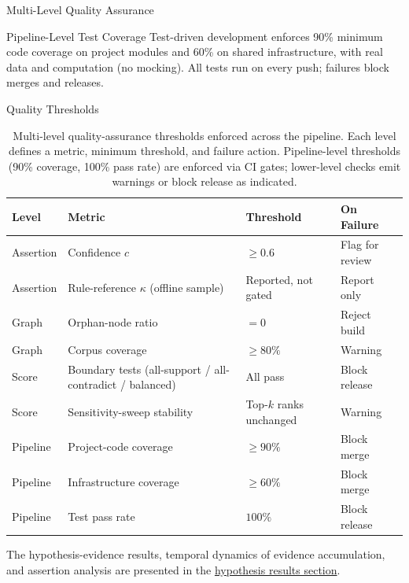 \documentclass[
  ignorenonframetext,
]{beamer}
\begin{document}
\begin{frame}[allowframebreaks]{Multi-Level Quality Assurance}
\begin{block}{Pipeline-Level Test Coverage}
\protect{}\label{pipeline-level-test-coverage}
Test-driven development enforces 90\% minimum code coverage on project
modules and 60\% on shared infrastructure, with real data and
computation (no mocking). All tests run on every push; failures block
merges and releases.
\end{block}

\begin{block}{Quality Thresholds}
\protect{}\label{quality-thresholds}
\begin{table}[H]
\centering
\caption{Multi-level quality-assurance thresholds enforced across the pipeline. Each level defines a metric, minimum threshold, and failure action. Pipeline-level thresholds (90\% coverage, 100\% pass rate) are enforced via CI gates; lower-level checks emit warnings or block release as indicated.}
\label{tab:quality_thresholds}
\begin{tabular}{llll}
\toprule
\textbf{Level} & \textbf{Metric} & \textbf{Threshold} & \textbf{On Failure} \\
\midrule
Assertion & Confidence $c$ & $\geq 0.6$ & Flag for review \\
Assertion & Rule-reference $\kappa$ (offline sample) & Reported, not gated & Report only \\
Graph & Orphan-node ratio & $= 0$ & Reject build \\
Graph & Corpus coverage & $\geq 80\%$ & Warning \\
Score & Boundary tests (all-support / all-contradict / balanced) & All pass & Block release \\
Score & Sensitivity-sweep stability & Top-$k$ ranks unchanged & Warning \\
Pipeline & Project-code coverage & $\geq 90\%$ & Block merge \\
Pipeline & Infrastructure coverage & $\geq 60\%$ & Block merge \\
Pipeline & Test pass rate & $100\%$ & Block release \\
\bottomrule
\end{tabular}
\end{table}

\FloatBarrier

The hypothesis-evidence results, temporal dynamics of evidence
accumulation, and assertion analysis are presented in the
\hyperref[sec:hypothesis_results]{hypothesis results section}.
\end{block}
\end{frame}
\end{document}
